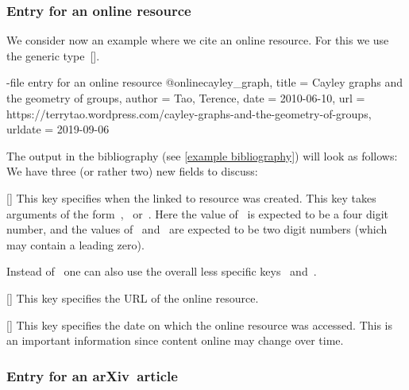 \subsubsection{Entry for an online resource}

We consider now an example where we cite an online resource.
For this we use the generic type~[\atname].
\begin{showcode}[label = {bib entry online}]{-file entry for an online resource}
@online{cayley_graph,
  title   = {Cayley graphs and the geometry of groups},
  author  = {Tao, Terence},
  date    = {2010-06-10},
  url     = {https://terrytao.wordpress.com/cayley-graphs-and-the-geometry-of-groups},
  urldate = {2019-09-06}
}
\end{showcode}
The output in the bibliography (see \cref{example bibliography}) will look as follows:
We have three (or rather two) new fields to discuss:
\begin{mydescription}
  \item[\optname{date}]
    [\optname]
    This key specifies when the linked to resource was created.
    This key takes arguments of the form~,~ or~.
    Here the value of~ is expected to be a four digit number, and the values of~ and~ are expected to be two digit numbers (which may contain a leading zero).
    
    Instead of~ one can also use the overall less specific keys~ and~.
  \item[\optname{url}]
    [\optname]
    This key specifies the URL of the online resource.
  \item[\optname{urldate}]
    [\optname]
    This key specifies the date on which the online resource was accessed.
    This is an important information since content online may change over time.
\end{mydescription}

\subsubsection{Entry for an arXiv~article}

